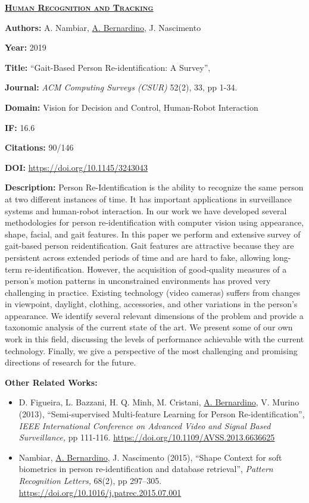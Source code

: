 \documentclass[
]{article}
\begin{document}
\textbf{\textsc{\ul{Human Recognition and Tracking}}}

\textbf{Authors:} A. Nambiar, \ul{A. Bernardino}, J. Nascimento

\textbf{Year:} 2019

\textbf{Title:} ``Gait-Based Person Re-identification: A Survey'',

\textbf{Journal:} \emph{ACM Computing Surveys (CSUR)} 52(2), 33, pp
1-34.

\textbf{Domain:} Vision for Decision and Control, Human-Robot
Interaction

\textbf{IF:} 16.6

\textbf{Citations:} 90/146

\textbf{DOI:} \url{https://doi.org/10.1145/3243043}~

\textbf{Description:} Person Re-Identification is the ability to
recognize the same person at two different instances of time. It has
important applications in surveillance systems and human-robot
interaction. In our work we have developed several methodologies for
person re-identification with computer vision using appearance, shape,
facial, and gait features. In this paper we perform and extensive survey
of gait-based person reidentification. Gait features are attractive
because they are persistent across extended periods of time and are hard
to fake, allowing long-term re-identification. However, the acquisition
of good-quality measures of a person's motion patterns in unconstrained
environments has proved very challenging in practice. Existing
technology (video cameras) suffers from changes in viewpoint, daylight,
clothing, accessories, and other variations in the person's appearance.
We identify several relevant dimensions of the problem and provide a
taxonomic analysis of the current state of the art. We present some of
our own work in this field, discussing the levels of performance
achievable with the current technology. Finally, we give a perspective
of the most challenging and promising directions of research for the
future.

\textbf{Other Related Works:}

\begin{itemize}
\item
  D. Figueira, L. Bazzani, H. Q. Minh, M. Cristani, \ul{A. Bernardino},
  V. Murino (2013), ``Semi-supervised Multi-feature Learning for Person
  Re-identification'', \emph{IEEE International Conference on Advanced
  Video and Signal Based Surveillance,} pp 111-116.
  \url{https://doi.org/10.1109/AVSS.2013.6636625}
\item
  Nambiar, \ul{A. Bernardino}, J. Nascimento (2015), ``Shape Context for
  soft biometrics in person re-identification and database retrieval'',
  \emph{Pattern Recognition Letters,} 68(2), pp 297--305.
  \url{https://doi.org/10.1016/j.patrec.2015.07.001}
\end{itemize}
\end{document}
